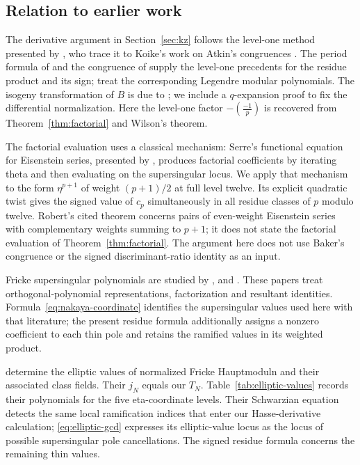 \documentclass[11pt,a4paper]{article}
\numberwithin{equation}{section}
\theoremstyle{definition}
\theoremstyle{remark}
\begin{document}
\subsection{Relation to earlier work}
The derivative argument in Section~\ref{sec:kz} follows the level-one method
presented by \citet[\S10]{KZ98}, who trace it to Koike's work
on Atkin's congruences \citep{Koike73}. The period formula of \citet{dS94}
and the congruence of \citet{Baker98} supply the level-one precedents for the
residue product and its sign; \citet{BL18} treat the corresponding Legendre
modular polynomials. The isogeny transformation of $B$ is due to
\citet[Th\'eor\`eme B, p.~106; \S3.3, Lemma~7 and (19), p.~124]{Robert80};
we include a $q$-expansion proof to fix the differential normalization.
Here the level-one factor $-\left(\frac{-1}{p}\right)$ is recovered from
Theorem~\ref{thm:factorial} and Wilson's theorem.

The factorial evaluation uses a classical mechanism: Serre's functional
equation for Eisenstein series, presented by
\citet[\S2.5, Th\'eor\`eme~2, p.~119]{Robert80}, produces factorial
coefficients by iterating theta and then evaluating on the supersingular
locus. We apply that mechanism to the form $\eta^{p+1}$ of weight
$(p+1)/2$ at full level twelve. Its explicit quadratic twist gives the
signed value of $c_p$ simultaneously in all residue classes of $p$
modulo twelve. Robert's cited theorem concerns pairs of even-weight
Eisenstein series with complementary weights summing to $p+1$; it does
not state the factorial evaluation of Theorem~\ref{thm:factorial}. The argument here does not use
Baker's congruence or the signed discriminant-ratio identity as an input.

Fricke supersingular polynomials are studied by \citet{Sakai11,Sakai14},
\citet{Nakaya19} and \citet{Morton23}. These papers treat
orthogonal-polynomial representations, factorization and resultant
identities. Formula~\eqref{eq:nakaya-coordinate} identifies the supersingular
values used here with that literature; the present residue formula additionally
assigns a nonzero coefficient to each thin pole and retains the ramified values
in its weighted product.

\citet[\S4.2, Table~1 and Appendix~C]{JST19} determine the elliptic values
of normalized Fricke Hauptmoduln and their associated class fields. Their
$j_N$ equals our $T_N$. Table~\ref{tab:elliptic-values} records their
polynomials for the five eta-coordinate levels. Their Schwarzian equation
detects the same local ramification indices that enter our Hasse-derivative
calculation; \eqref{eq:elliptic-gcd} expresses its elliptic-value locus as
the locus of possible supersingular pole cancellations. The signed residue
formula concerns the remaining thin values.
\end{document}
